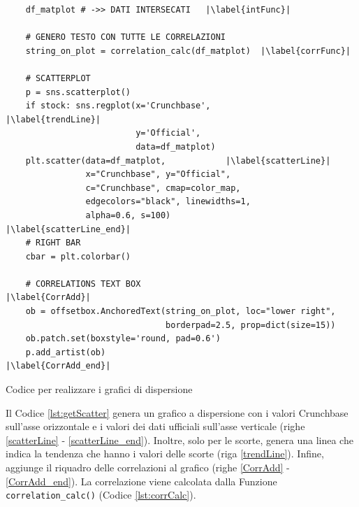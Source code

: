 \begin{listing}[htbp]
\begin{verbatim}
    df_matplot # ->> DATI INTERSECATI   |\label{intFunc}|
                    
    # GENERO TESTO CON TUTTE LE CORRELAZIONI
    string_on_plot = correlation_calc(df_matplot)  |\label{corrFunc}|

    # SCATTERPLOT
    p = sns.scatterplot()
    if stock: sns.regplot(x='Crunchbase',           |\label{trendLine}| 
                          y='Official', 
                          data=df_matplot)        
    plt.scatter(data=df_matplot,            |\label{scatterLine}| 
                x="Crunchbase", y="Official",        
                c="Crunchbase", cmap=color_map,
                edgecolors="black", linewidths=1, 
                alpha=0.6, s=100)                               |\label{scatterLine_end}|
    # RIGHT BAR
    cbar = plt.colorbar()
    
    # CORRELATIONS TEXT BOX                                 |\label{CorrAdd}|
    ob = offsetbox.AnchoredText(string_on_plot, loc="lower right", 
                                borderpad=2.5, prop=dict(size=15))
    ob.patch.set(boxstyle='round, pad=0.6')
    p.add_artist(ob)                                    |\label{CorrAdd_end}|
\end{verbatim}
\caption{Codice per realizzare i grafici di dispersione}
\label{lst:getScatter}
\end{listing}

Il Codice \ref{lst:getScatter} genera un grafico a dispersione con i valori Crunchbase sull'asse orizzontale e i valori dei dati ufficiali sull'asse verticale (righe \ref{scatterLine} - \ref{scatterLine_end}). Inoltre, solo per le scorte, genera una linea che indica la tendenza che hanno i valori delle scorte (riga \ref{trendLine}). Infine, aggiunge il riquadro delle correlazioni al grafico (righe \ref{CorrAdd} - \ref{CorrAdd_end}). La correlazione viene calcolata dalla Funzione \texttt{correlation\_calc()} (Codice \ref{lst:corrCalc}).


